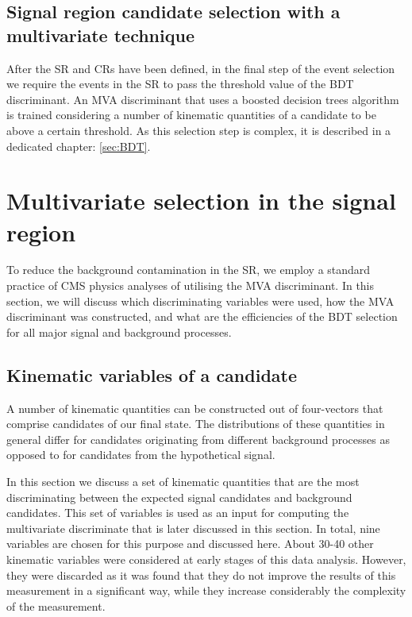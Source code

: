\subsection{Signal region candidate selection with a multivariate technique}

After the SR and CRs have been defined, in the final step of the event selection we require the events in the SR to pass the threshold value of the BDT discriminant. An MVA discriminant that uses a boosted decision trees algorithm is trained considering a number of kinematic quantities of a candidate to be above a certain threshold. As this selection step is complex, it is described in a dedicated chapter: \ref{sec:BDT}.

\section{Multivariate selection in the signal region}

To reduce the background contamination in the SR, we employ a standard practice of CMS physics analyses of utilising the MVA discriminant. In this section, we will discuss which discriminating variables were used, how the MVA discriminant was constructed, and what are the efficiencies of the BDT selection for all major signal and background processes. 
\label{sec:BDT}

\subsection{Kinematic variables of a candidate}

A  number of kinematic quantities can be constructed out of four-vectors that comprise candidates of our final state.  The distributions of these quantities in general differ for candidates originating from different background processes as opposed to for candidates from the hypothetical signal. 
           
In this section we discuss a set of kinematic quantities that are the most discriminating between the expected signal candidates and background candidates. This set of variables is used as an input for computing the multivariate discriminate that is later discussed in this section. In total, nine variables are chosen for this purpose and discussed here. About 30-40 other kinematic variables were considered at early stages of this data analysis. However, they were discarded as it was found that they do not improve the results of this measurement in a  significant way, while they increase considerably the complexity of the measurement.
           
